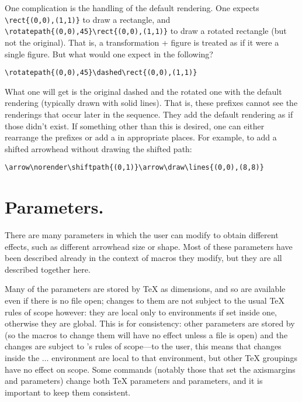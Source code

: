 \documentclass[letterpaper]{article}
\begin{document}
One complication is the handling of the default rendering. One expects
\verb$\rect{(0,0),(1,1)}$ to draw a rectangle, and
\verb$\rotatepath{(0,0),45}\rect{(0,0),(1,1)}$ to draw a rotated
rectangle (but not the original). That is, a transformation + figure is
treated as if it were a single figure. But what would one expect in the
following?
\begin{verbatim}
\rotatepath{(0,0),45}\dashed\rect{(0,0),(1,1)}
\end{verbatim}
What one will get is the original dashed and the rotated one with the
default rendering (typically drawn with solid lines). That is, these
prefixes cannot see the renderings that occur later in the sequence.
They add the default rendering as if those didn't exist. If something
other than this is desired, one can either rearrange the prefixes or add
a \label{norenderexample} in appropriate
places. For example, to add a shifted arrowhead without drawing the
shifted path:
\begin{verbatim}
\arrow\norender\shiftpath{(0,1)}\arrow\draw\lines{(0,0),(8,8)}
\end{verbatim}

\section{Parameters.}\label{parameters}

There are many parameters in \mfp{} which the user can modify to
obtain different effects, such as different arrowhead size or shape.
Most of these parameters have been described already in the context of
macros they modify, but they are all described together here.

Many of the parameters are stored by \TeX{} as dimensions, and so are
available even if there is no \MF{} file open; changes to them are not
subject to the usual \TeX{} rules of scope however: they are local
only to  environments if set inside one, otherwise
they are global. This is for consistency: other parameters are stored by
\MF{} (so the macros to change them will have no effect unless a \MF{}
file is open) and the changes are subject to \MF{}'s rules of scope---to
the \mfp{} user, this means that changes inside the  $\ldots$
 environment are local to that environment, but other
\TeX{} groupings have no effect on scope. Some commands (notably those
that set the axismargins and  parameters) change both \TeX{}
parameters and \MF{} parameters, and it is important to keep them
consistent.
\end{document}
